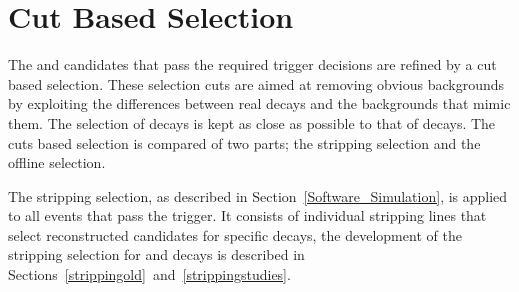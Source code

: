 


\section{Cut Based Selection}
\label{sec:cutbasedsel}
The \bsmumu and \bhh candidates that pass the required trigger decisions are refined by a cut based selection. These selection cuts are aimed at removing obvious backgrounds by exploiting the differences between real \bsmumu decays and the backgrounds that mimic them. The selection of \bhh decays is kept as close as possible to that of \bsmumu decays. The cuts based selection is compared of two parts; the stripping selection and the offline selection. 

The stripping selection, as described in Section~\ref{Software_Simulation}, is applied to all events that pass the trigger. It consists of individual stripping lines that select reconstructed candidates for specific decays, the development of the stripping selection for \bsmumu and \bhh decays is described in Sections~\ref{strippingold}~and~\ref{strippingstudies}.%



